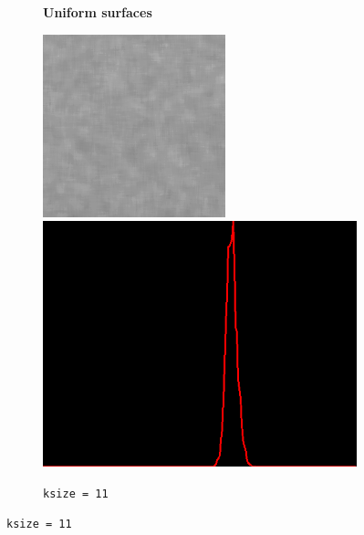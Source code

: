 \begin{figure}[H]
\begin{subfigure}[b]{0.28\textwidth}
        \begin{center}
        	\textbf{Uniform surfaces}
        \end{center}
        \includegraphics[width=\textwidth]{img2/rect_11_median_11_final_img2.png}\\[0.1cm]
        \includegraphics[width=\textwidth]{img2/hist_rect_11_median_11_final_img2.png}
        \caption{\lstinline|ksize = 11|}

\end{subfigure}
\end{figure}
